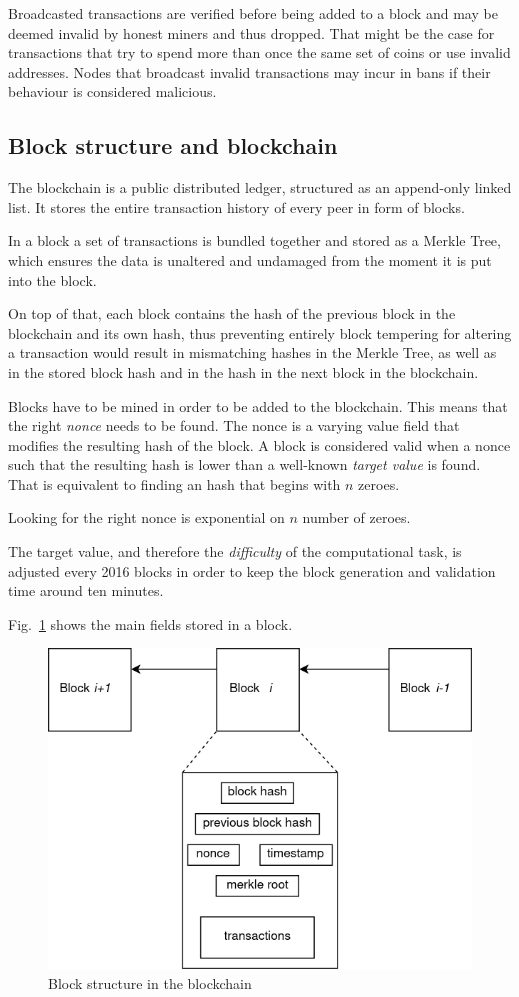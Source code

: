 \documentclass[12pt, letterpaper, twoside]{article}
\begin{document}
Broadcasted transactions are verified before being added to a block and may be deemed invalid by honest miners and thus dropped. That might be the case for transactions that try to spend more than once the same set of coins or use invalid addresses. Nodes that broadcast invalid transactions may incur in bans if their behaviour is considered malicious.

\subsection{Block structure and blockchain}\label{sec:block}
The blockchain is a public distributed ledger, structured as an append-only linked list. It stores the entire transaction history of every peer in form of blocks.

In a block a set of transactions is bundled together and stored as a Merkle Tree, which ensures the data is unaltered and undamaged from the moment it is put into the block.

On top of that, each block contains the hash of the previous block in the blockchain and its own hash, thus preventing entirely block tempering for altering a transaction would result in mismatching hashes in the Merkle Tree, as well as in the stored block hash and in the hash in the next block in the blockchain.

Blocks have to be mined in order to be added to the blockchain. This means that the right \emph{nonce} needs to be found. The nonce is a varying value field that modifies the resulting hash of the block. A block is considered valid when a nonce such that the resulting hash is lower than a well-known \emph{target value} is found. That is equivalent to finding an hash that begins with $n$ zeroes.

Looking for the right nonce is exponential on $n$ number of zeroes.

The target value, and therefore the \emph{difficulty} of the computational task, is adjusted every 2016 blocks in order to keep the block generation and validation time around ten minutes.

Fig.~\ref{fig:blockstruct} shows the main fields stored in a block.

\begin{figure}[h]
	\includegraphics[width=.55\textwidth]{pict/blockstruct.png}
	\centering
	\caption{Block structure in the blockchain}
	\label{fig:blockstruct}
\end{figure}
\end{document}

